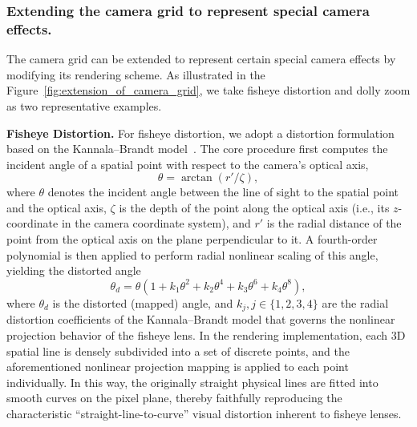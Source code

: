 \documentclass[letterpaper]{article} %
\begin{document}
\subsubsection{Extending the camera grid to represent special camera effects.}
The camera grid can be extended to represent certain special camera effects by modifying its rendering scheme. As illustrated in the Figure~\ref{fig:extension_of_camera_grid}, we take fisheye distortion and dolly zoom as two representative examples.

\textbf{Fisheye Distortion.}
For fisheye distortion, we adopt a distortion formulation based on the Kannala--Brandt model~\cite{kannala2006generic}. The core procedure first computes the incident angle of a spatial point with respect to the camera's optical axis,
\begin{equation}
    \theta = \arctan(r' / \zeta),
\end{equation}
where $\theta$ denotes the incident angle between the line of sight to the spatial point and the optical axis, $\zeta$ is the depth of the point along the optical axis (i.e., its $z$-coordinate in the camera coordinate system), and $r'$ is the radial distance of the point from the optical axis on the plane perpendicular to it. A fourth-order polynomial is then applied to perform radial nonlinear scaling of this angle, yielding the distorted angle
\begin{equation}
    \theta_d = \theta\left(1 + k_1\theta^2 + k_2\theta^4 
    + k_3\theta^6 + k_4\theta^8\right),
\end{equation}
where $\theta_d$ is the distorted (mapped) angle, and 
$k_j, j\in\{1,2,3,4\}$ are the radial distortion coefficients of the 
Kannala--Brandt model that governs the nonlinear projection behavior of the fisheye lens. In the rendering implementation, each 3D spatial line is densely subdivided into a set of discrete points, and the aforementioned nonlinear projection mapping is applied to each point individually. In this way, the originally straight physical lines are fitted into smooth curves on the pixel plane, thereby faithfully reproducing the characteristic ``straight-line-to-curve'' visual distortion inherent to fisheye lenses.
\end{document}
